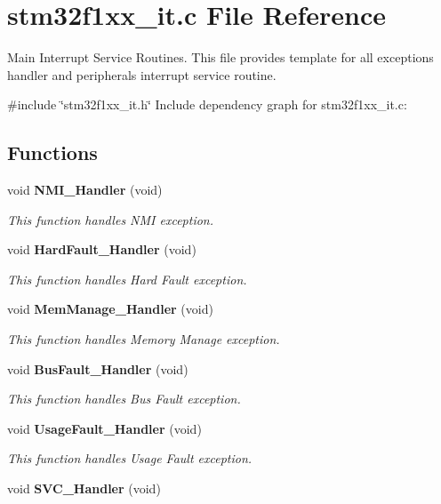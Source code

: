 \section{stm32f1xx\+\_\+it.\+c File Reference}
\label{stm32f1xx__it_8c}


Main Interrupt Service Routines. This file provides template for all exceptions handler and peripherals interrupt service routine.  


{\ttfamily \#include \char`\"{}stm32f1xx\+\_\+it.\+h\char`\"{}}\newline
Include dependency graph for stm32f1xx\+\_\+it.\+c\+:
\subsection*{Functions}
\begin{DoxyCompactItemize}
\item 
void \textbf{ N\+M\+I\+\_\+\+Handler} (void)
\begin{DoxyCompactList}\small\item\em This function handles N\+MI exception. \end{DoxyCompactList}\item 
void \textbf{ Hard\+Fault\+\_\+\+Handler} (void)
\begin{DoxyCompactList}\small\item\em This function handles Hard Fault exception. \end{DoxyCompactList}\item 
void \textbf{ Mem\+Manage\+\_\+\+Handler} (void)
\begin{DoxyCompactList}\small\item\em This function handles Memory Manage exception. \end{DoxyCompactList}\item 
void \textbf{ Bus\+Fault\+\_\+\+Handler} (void)
\begin{DoxyCompactList}\small\item\em This function handles Bus Fault exception. \end{DoxyCompactList}\item 
void \textbf{ Usage\+Fault\+\_\+\+Handler} (void)
\begin{DoxyCompactList}\small\item\em This function handles Usage Fault exception. \end{DoxyCompactList}\item 
void \textbf{ S\+V\+C\+\_\+\+Handler} (void)

\end{DoxyCompactItemize}
